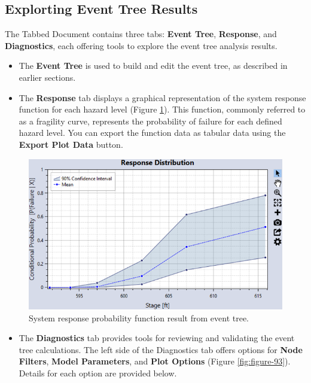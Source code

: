 \documentclass[
]{book}
\providecommand{\tightlist}{%
  \setlength{\itemsep}{0pt}\setlength{\parskip}{0pt}}
\begin{document}
\hypertarget{explorting-event-tree-results}{%
\subsection{Explorting Event Tree Results}\label{explorting-event-tree-results}}

The Tabbed Document contains three tabs: \textbf{Event Tree}, \textbf{Response}, and \textbf{Diagnostics}, each offering tools to explore the event tree analysis results.

\begin{itemize}
\item
  The \textbf{Event Tree} is used to build and edit the event tree, as described in earlier sections.
\item
  The \textbf{Response} tab displays a graphical representation of the system response function for each hazard level (Figure \ref{fig:figure-92}). This function, commonly referred to as a fragility curve, represents the probability of failure for each defined hazard level. You can export the function data as tabular data using the \textbf{Export Plot Data} button.
\end{itemize}

\begin{figure}

{\centering \includegraphics{images/figure92} 

}

\caption{System response probability function result from event tree.}\label{fig:figure-92}
\end{figure}

\begin{itemize}
\tightlist
\item
  The \textbf{Diagnostics} tab provides tools for reviewing and validating the event tree calculations. The left side of the Diagnostics tab offers options for \textbf{Node Filters}, \textbf{Model Parameters}, and \textbf{Plot Options} (Figure \ref{fig:figure-93}). Details for each option are provided below.
\end{itemize}
\end{document}
